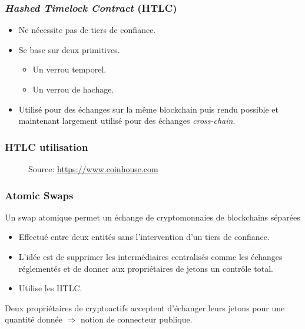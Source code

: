 
\begin{frame}
	\frametitle{\textit{Hashed Timelock Contract} (HTLC)}
	\begin{itemize}
		\item Ne nécessite pas de tiers de confiance.
		\item Se base sur deux primitives.
		      \begin{itemize}
			      \item Un verrou temporel.
			      \item Un verrou de hachage.
		      \end{itemize}
		\item Utilisé pour des échanges sur la même blockchain puis rendu possible et maintenant largement utilisé pour des échanges \textit{cross-chain}.
	\end{itemize}
\end{frame}


\begin{frame}
	\frametitle{HTLC utilisation}

	\begin{figure}[h!]

		{\scriptsize
			Source: \url{https://www.coinhouse.com}}
	\end{figure}

\end{frame}

\begin{frame}
	\frametitle{Atomic Swaps}
	Un swap atomique permet un échange de cryptomonnaies de blockchains séparées
	\begin{itemize}
		\item Effectué entre deux entités sans l’intervention d’un tiers de confiance.
		\item L’idée est de supprimer les intermédiaires centralisés comme les échanges réglementés et de donner aux propriétaires de jetons un contrôle total.
		\item Utilise les HTLC. \newline
	\end{itemize}
	Deux propriétaires de cryptoactifs acceptent d’échanger leurs jetons pour une quantité donnée
	$\Rightarrow$ notion de connecteur publique.
\end{frame}

